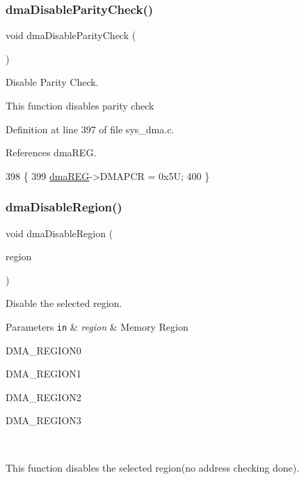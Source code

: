 \subsubsection{\texorpdfstring{dma\+Disable\+Parity\+Check()}{dmaDisableParityCheck()}}
{\footnotesize\ttfamily void dma\+Disable\+Parity\+Check (\begin{DoxyParamCaption}\item[{void}]{ }\end{DoxyParamCaption})}



Disable Parity Check. 

This function disables parity check 

Definition at line 397 of file sys\+\_\+dma.\+c.



References dma\+R\+EG.


\begin{DoxyCode}
398 \{
399     \mbox{\hyperlink{reg__dma_8h_aae27308852f460efc99fcbf6eb47ea86}{dmaREG}}->DMAPCR = 0x5U;
400 \}
\end{DoxyCode}
\mbox{\label{group__DMA_ga70ded995f289b44465e9421bacacad8e}} 
\subsubsection{\texorpdfstring{dma\+Disable\+Region()}{dmaDisableRegion()}}
{\footnotesize\ttfamily void dma\+Disable\+Region (\begin{DoxyParamCaption}\item[{dma\+R\+E\+G\+I\+O\+N\+\_\+t}]{region }\end{DoxyParamCaption})}



Disable the selected region. 


\begin{DoxyParams}[1]{Parameters}
\mbox{\tt in}  & {\em region} & Memory Region
\begin{DoxyItemize}
\item D\+M\+A\+\_\+\+R\+E\+G\+I\+O\+N0
\item D\+M\+A\+\_\+\+R\+E\+G\+I\+O\+N1
\item D\+M\+A\+\_\+\+R\+E\+G\+I\+O\+N2
\item D\+M\+A\+\_\+\+R\+E\+G\+I\+O\+N3
\end{DoxyItemize}\\
\hline
\end{DoxyParams}
This function disables the selected region(no address checking done). 

